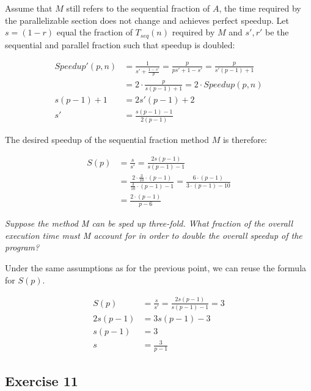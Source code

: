\documentclass[a4paper,10pt]{article}
\begin{document}
\vspace{3mm}

Assume that $M$ still refers to the sequential fraction of $A$, the time required by
the parallelizable section does not change and achieves perfect speedup.
Let $s = (1 - r)$ equal the fraction of
$T_{seq}(n)$ required by $M$ and $s', r'$ be the sequential and parallel fraction
such that speedup is doubled:

\begin{align}
Speedup'(p, n) &= \frac{1}{s' + \frac{1 - s'}{p}} = \frac{p}{ps' + 1 - s'} = \frac{p}{s'(p - 1) + 1} \\
               &= 2 \cdot \frac{p}{s(p - 1) + 1} = 2 \cdot Speedup(p, n) \\
s(p - 1) + 1   &= 2s'(p - 1) + 2 \\
s'             &= \frac{s(p - 1) - 1}{2(p - 1)}
\end{align}

The desired speedup of the sequential fraction method $M$ is therefore:

\begin{align}
S(p) &= \frac{s}{s'} = \frac{2s(p - 1)}{s(p - 1) - 1} \\
     &= \frac{2 \cdot \frac{3}{10} \cdot (p - 1)}{\frac{3}{10} \cdot (p - 1) - 1} 
      = \frac{6 \cdot (p - 1)}{3 \cdot (p - 1) - 10} \\
     &= \frac{2 \cdot (p - 1)}{p - 6} 
\end{align}


\emph{Suppose the method M can be sped up three-fold. What fraction of the overall
execution time must M account for in order to double the overall speedup of
the program?}

\vspace{3mm}

Under the same assumptions as for the previous point, we can reuse the formula
for $S(p)$.

\begin{align}
S(p)      &= \frac{s}{s'} = \frac{2s(p - 1)}{s(p - 1) - 1} = 3 \\
2s(p - 1) &= 3s(p - 1) - 3 \\
s(p - 1)  &= 3 \\
s         &= \frac{3}{p - 1}
\end{align}

\subsection{Exercise 11}
\end{document}
